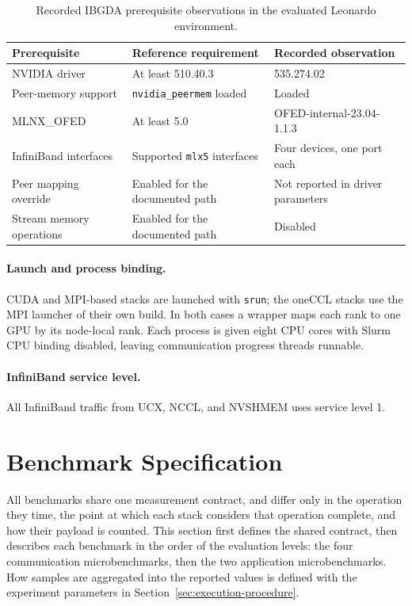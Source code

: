 \begin{table}[htbp]
\centering
\caption{Recorded IBGDA prerequisite observations in the evaluated Leonardo environment.}
\label{tab:m-ibgda-check}
\footnotesize
\begin{tabularx}{\textwidth}{lYY}
\toprule
Prerequisite & Reference requirement & Recorded observation\\
\midrule
NVIDIA driver & At least 510.40.3 & 535.274.02\\
Peer-memory support & \texttt{nvidia\_peermem} loaded & Loaded\\
MLNX\_OFED & At least 5.0 & OFED-internal-23.04-1.1.3\\
InfiniBand interfaces & Supported \texttt{mlx5} interfaces & Four devices, one port each\\
Peer mapping override & Enabled for the documented path & Not reported in driver parameters\\
Stream memory operations & Enabled for the documented path & Disabled\\
\bottomrule
\end{tabularx}
\end{table}

\paragraph{Launch and process binding.} CUDA and MPI-based stacks are launched with \texttt{srun}; the oneCCL stacks use the MPI launcher of their own build. In both cases a wrapper maps each rank to one GPU by its node-local rank. Each process is given eight CPU cores with Slurm CPU binding disabled, leaving communication progress threads runnable.

\paragraph{InfiniBand service level.} All InfiniBand traffic from UCX, NCCL, and NVSHMEM uses service level 1.

\section{Benchmark Specification}\label{sec:benchmark-method}

All benchmarks share one measurement contract, and differ only in the operation they time, the point at which each stack considers that operation complete, and how their payload is counted. This section first defines the shared contract, then describes each benchmark in the order of the evaluation levels: the four communication microbenchmarks, then the two application microbenchmarks. How samples are aggregated into the reported values is defined with the experiment parameters in Section~\ref{sec:execution-procedure}.

